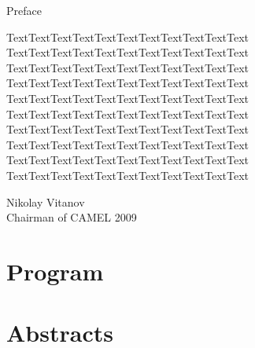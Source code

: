 \documentclass[12pt]{book}
\begin{document}
{\large Preface}

\vspace{1cm}

TextTextTextTextTextTextTextTextTextTextText
TextTextTextTextTextTextTextTextTextTextText
TextTextTextTextTextTextTextTextTextTextText
TextTextTextTextTextTextTextTextTextTextText
TextTextTextTextTextTextTextTextTextTextText
TextTextTextTextTextTextTextTextTextTextText
TextTextTextTextTextTextTextTextTextTextText
TextTextTextTextTextTextTextTextTextTextText
TextTextTextTextTextTextTextTextTextTextText
TextTextTextTextTextTextTextTextTextTextText

\vspace{1cm}

Nikolay Vitanov\\
Chairman of CAMEL 2009

\pagebreak
\thispagestyle{empty}

\tableofcontents
\clearpage{\pagestyle{empty}\cleardoublepage}
\mainmatter

\fancyhead[RO,LE]{\thepage}
\fancyfoot{}

\chapter*{Program}
 

\newpage



\newpage

\setcounter{page}{1}

\chapter*{Abstracts}
\thispagestyle{empty}


{} 
 

{} 
 

{} 
 

{} 
 

{} 
 
\end{document}
